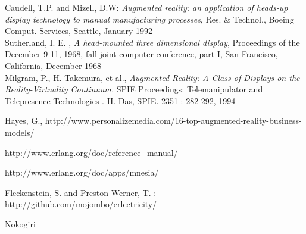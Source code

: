 \renewcommand{\bibname}{References}
\begin{thebibliography}{Abc 99}

 Caudell, T.P. and Mizell, D.W: {\sl Augmented reality: an application of heads-up display technology to manual manufacturing processes}, Res. \& Technol., Boeing Comput. Services, Seattle, January 1992\\

 Sutherland, I. E. , {\sl A head-mounted three dimensional display}, Proceedings of the December 9-11, 1968, fall joint computer conference, part I, San Francisco, California,  December 1968\\

 Milgram, P., H. Takemura, et al., {\sl Augmented Reality: A Class of Displays on the Reality-Virtuality Continuum.} SPIE Proceedings: Telemanipulator and Telepresence Technologies . H. Das, SPIE. 2351 : 282-292, 1994

 Hayes, G., http://www.personalizemedia.com/16-top-augmented-reality-business-models/

 http://www.erlang.org/doc/reference\_manual/

http://www.erlang.org/doc/apps/mnesia/

Fleckenstein, S. and Preston-Werner, T. : http://github.com/mojombo/erlectricity/

Nokogiri

\end{thebibliography}
